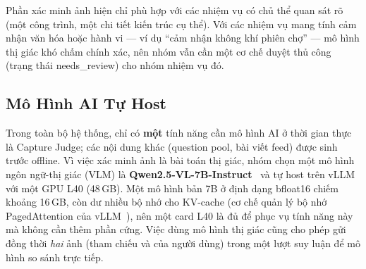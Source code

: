 \begin{note}
Phần xác minh ảnh hiện chỉ phù hợp với các nhiệm vụ có chủ thể quan sát
rõ (một công trình, một chi tiết kiến trúc cụ thể). Với các nhiệm vụ
mang tính cảm nhận văn hóa hoặc hành vi --- ví dụ ``cảm nhận không khí
phiên chợ'' --- mô hình thị giác khó chấm chính xác, nên nhóm vẫn cần
một cơ chế duyệt thủ công (trạng thái \textsf{needs\_review}) cho nhóm
nhiệm vụ đó.
\end{note}

\subsection{Mô Hình AI Tự Host}
\contrib

Trong toàn bộ hệ thống, chỉ có \textbf{một} tính năng cần mô hình AI ở
thời gian thực là Capture Judge; các nội dung khác (question pool, bài
viết feed) được sinh trước offline. Vì việc xác minh ảnh là bài toán thị
giác, nhóm chọn một mô hình ngôn ngữ-thị giác (VLM) là
\textbf{Qwen2.5-VL-7B-Instruct}~\cite{qwen25vl} và tự host trên
vLLM~\cite{kwon2023vllm, vllm_docs} với một GPU L40 (48\,GB). Một mô hình
bản 7B ở định dạng bfloat16 chiếm khoảng 16\,GB, còn dư nhiều bộ nhớ cho
KV-cache (cơ chế quản lý bộ nhớ PagedAttention của vLLM~\cite{kwon2023vllm}),
nên một card L40 là đủ để phục vụ tính năng này mà không cần thêm phần cứng. Việc dùng mô hình thị giác cũng cho
phép gửi đồng thời \textit{hai} ảnh (tham chiếu và của người dùng) trong
một lượt suy luận để mô hình so sánh trực tiếp.
